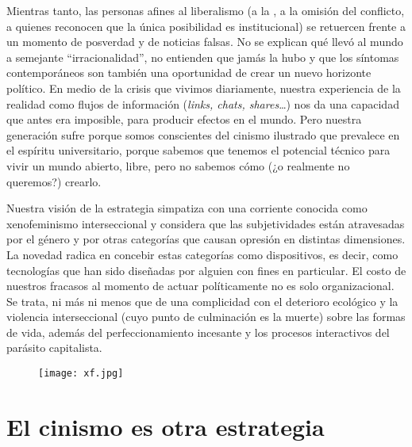 Mientras tanto, las personas afines al liberalismo (a la , a la omisión del conflicto, a quienes reconocen que la única posibilidad es institucional) se retuercen frente a un momento de posverdad y de noticias falsas. No se explican qué llevó al mundo a semejante \enquote{irracionalidad},\revquotes{} no entienden que jamás la hubo y que los síntomas contemporáneos son también una oportunidad de crear un nuevo horizonte político. En medio de la crisis que vivimos diariamente, nuestra experiencia de la realidad como flujos de información (\emph{links, chats, shares}\ldots{}) nos da una capacidad que antes era imposible, para producir efectos en el mundo. Pero nuestra generación sufre porque somos conscientes del cinismo ilustrado que prevalece en el espíritu universitario, porque sabemos que tenemos el potencial técnico para vivir un mundo abierto, libre, pero no sabemos cómo (¿o realmente no queremos?) crearlo.

Nuestra visión de la estrategia simpatiza con una corriente conocida como xenofeminismo interseccional\addref{} y considera que las subjetividades están atravesadas por el género y por otras categorías que causan opresión en distintas dimensiones. La novedad radica en concebir estas categorías como dispositivos, es decir, como tecnologías que han sido diseñadas por alguien con fines en particular. El costo de nuestros fracasos al momento de actuar políticamente no es solo organizacional. Se trata, ni más ni menos que de una complicidad con el deterioro ecológico y la violencia interseccional (cuyo punto de culminación es la muerte) sobre las formas de vida, además del perfeccionamiento incesante y los procesos interactivos del parásito capitalista.

\begin{figure}[htbp]
	\centering	\texttt{[image: xf.jpg]}
	\caption{}
	\label{fig:xf}
\end{figure}

\section{El cinismo es otra estrategia}
\label{sec:cinismo}

